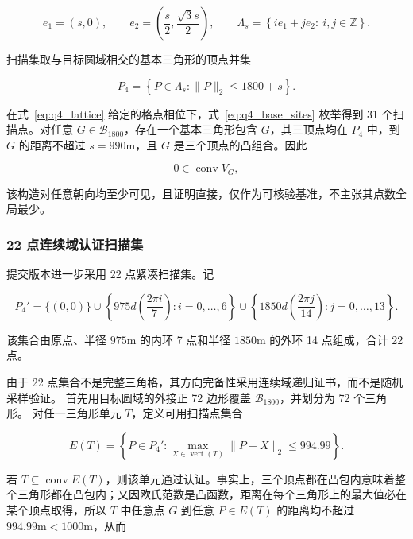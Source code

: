 \begin{equation}
e_1=(s,0),\qquad
e_2=\left(\frac{s}{2},\frac{\sqrt{3}s}{2}\right),
\qquad
\Lambda_s=
\left\{
ie_1+je_2:\ i,j\in\mathbb Z
\right\}.
\label{eq:q4_lattice}
\end{equation}

扫描集取与目标圆域相交的基本三角形的顶点并集

\begin{equation}
P_4=
\left\{
P\in\Lambda_s:
\lVert P\rVert_2\le1800+s
\right\}.
\label{eq:q4_base_sites}
\end{equation}

在式~\eqref{eq:q4_lattice} 给定的格点相位下，式~\eqref{eq:q4_base_sites} 枚举得到 31 个扫描点。对任意 $G\in\mathcal B_{1800}$，存在一个基本三角形包含 $G$，其三顶点均在 $P_4$ 中，到 $G$ 的距离不超过 $s=990\mathrm{m}$，且 $G$ 是三个顶点的凸组合。因此

\begin{equation}
0\in\operatorname{conv}V_G,
\label{eq:q4_lattice_certificate}
\end{equation}

该构造对任意朝向均至少可见，且证明直接，仅作为可核验基准，不主张其点数全局最少。

\subsubsection{22 点连续域认证扫描集}

提交版本进一步采用 22 点紧凑扫描集。记

\begin{equation}
P_4'=
\{(0,0)\}
\cup
\left\{
975d\left(\frac{2\pi i}{7}\right):
i=0,\ldots,6
\right\}
\cup
\left\{
1850d\left(\frac{2\pi j}{14}\right):
j=0,\ldots,13
\right\}.
\label{eq:q4_compact_sites}
\end{equation}

该集合由原点、半径 $975\mathrm{m}$ 的内环 7 点和半径 $1850\mathrm{m}$ 的外环 14 点组成，合计 22 点。

由于 22 点集合不是完整三角格，其方向完备性采用连续域递归证书，而不是随机采样验证。
首先用目标圆域的外接正 72 边形覆盖 $\mathcal B_{1800}$，并划分为 72 个三角形。
对任一三角形单元 $T$，定义可用扫描点集合

\begin{equation}
E(T)=
\left\{
P\in P_4':
\max_{X\in\operatorname{vert}(T)}
\lVert P-X\rVert_2\le994.99
\right\}.
\label{eq:q4_eligible_set}
\end{equation}

若 $T\subseteq\operatorname{conv}E(T)$，则该单元通过认证。事实上，三个顶点都在凸包内意味着整个三角形都在凸包内；又因欧氏范数是凸函数，距离在每个三角形上的最大值必在某个顶点取得，所以 $T$ 中任意点 $G$ 到任意 $P\in E(T)$ 的距离均不超过 $994.99\mathrm{m}<1000\mathrm{m}$，从而

